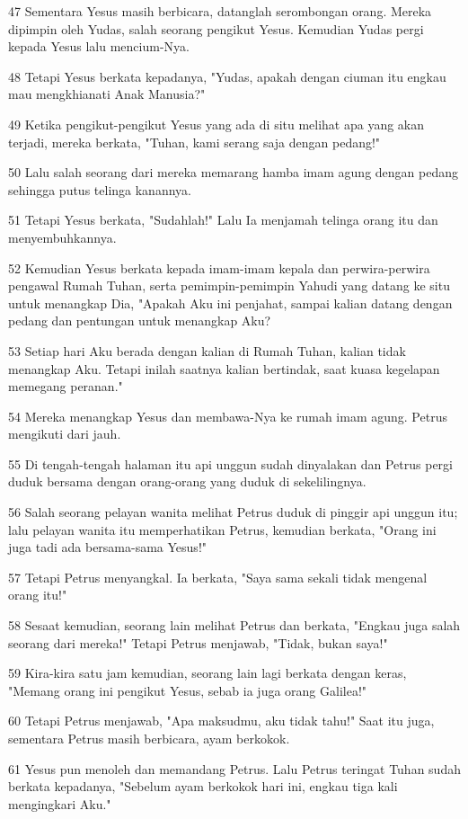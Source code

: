 \par 47 Sementara Yesus masih berbicara, datanglah serombongan orang. Mereka dipimpin oleh Yudas, salah seorang pengikut Yesus. Kemudian Yudas pergi kepada Yesus lalu mencium-Nya.
\par 48 Tetapi Yesus berkata kepadanya, "Yudas, apakah dengan ciuman itu engkau mau mengkhianati Anak Manusia?"
\par 49 Ketika pengikut-pengikut Yesus yang ada di situ melihat apa yang akan terjadi, mereka berkata, "Tuhan, kami serang saja dengan pedang!"
\par 50 Lalu salah seorang dari mereka memarang hamba imam agung dengan pedang sehingga putus telinga kanannya.
\par 51 Tetapi Yesus berkata, "Sudahlah!" Lalu Ia menjamah telinga orang itu dan menyembuhkannya.
\par 52 Kemudian Yesus berkata kepada imam-imam kepala dan perwira-perwira pengawal Rumah Tuhan, serta pemimpin-pemimpin Yahudi yang datang ke situ untuk menangkap Dia, "Apakah Aku ini penjahat, sampai kalian datang dengan pedang dan pentungan untuk menangkap Aku?
\par 53 Setiap hari Aku berada dengan kalian di Rumah Tuhan, kalian tidak menangkap Aku. Tetapi inilah saatnya kalian bertindak, saat kuasa kegelapan memegang peranan."
\par 54 Mereka menangkap Yesus dan membawa-Nya ke rumah imam agung. Petrus mengikuti dari jauh.
\par 55 Di tengah-tengah halaman itu api unggun sudah dinyalakan dan Petrus pergi duduk bersama dengan orang-orang yang duduk di sekelilingnya.
\par 56 Salah seorang pelayan wanita melihat Petrus duduk di pinggir api unggun itu; lalu pelayan wanita itu memperhatikan Petrus, kemudian berkata, "Orang ini juga tadi ada bersama-sama Yesus!"
\par 57 Tetapi Petrus menyangkal. Ia berkata, "Saya sama sekali tidak mengenal orang itu!"
\par 58 Sesaat kemudian, seorang lain melihat Petrus dan berkata, "Engkau juga salah seorang dari mereka!" Tetapi Petrus menjawab, "Tidak, bukan saya!"
\par 59 Kira-kira satu jam kemudian, seorang lain lagi berkata dengan keras, "Memang orang ini pengikut Yesus, sebab ia juga orang Galilea!"
\par 60 Tetapi Petrus menjawab, "Apa maksudmu, aku tidak tahu!" Saat itu juga, sementara Petrus masih berbicara, ayam berkokok.
\par 61 Yesus pun menoleh dan memandang Petrus. Lalu Petrus teringat Tuhan sudah berkata kepadanya, "Sebelum ayam berkokok hari ini, engkau tiga kali mengingkari Aku."

